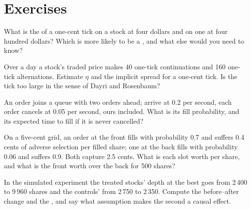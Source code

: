\section{Exercises}

\begin{exercise}[$\star$]\label{exo:mx:tick-size-queues-and-priority:1}
What is the  of a one-cent tick on a stock at four dollars and on one at four hundred dollars? Which is more likely to be a , and what else would you need to know?
\end{exercise}

\begin{exercise}[$\star$]\label{exo:mx:tick-size-queues-and-priority:2}
Over a day a stock's traded price makes 40 one-tick continuations and 160 one-tick alternations. Estimate $\eta$ and the implicit spread for a one-cent
tick. Is the tick too large in the sense of Dayri and Rosenbaum?
\end{exercise}

\begin{exercise}[$\star$]\label{exo:mx:tick-size-queues-and-priority:3}
An order joins a queue with two orders ahead;  arrive at 0.2 per second, each order cancels at 0.05 per second, ours included. What is its
fill probability, and its expected time to fill if it is never cancelled?
\end{exercise}

\begin{exercise}[$\star\star$]\label{exo:mx:tick-size-queues-and-priority:4}
On a five-cent grid, an order at the front fills with probability 0.7 and suffers 0.4 cents of adverse selection per filled share; one at the back fills
with probability 0.06 and suffers 0.9. Both capture 2.5 cents. What is each slot worth per share, and what is the front worth over the back for 500 shares?
\end{exercise}

\begin{exercise}[$\star\star$]\label{exo:mx:tick-size-queues-and-priority:5}
In the simulated experiment the treated stocks' depth at the best goes from 2\,400 to 9\,960 shares and the controls' from 2\,750 to 2\,350. Compute the
before--after change and the , and say what assumption makes the second a causal effect.
\end{exercise}

